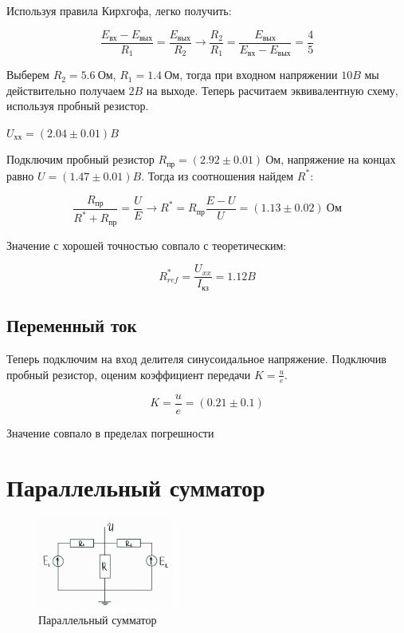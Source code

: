 \documentclass[a4paper]{article}
\begin{document}
Используя правила Кирхгофа, легко получить:

\begin{equation}
    \frac{E_\text{вх} - E_\text{вых}}{R_1} = \frac{E_\text{вых}}{R_2} \longrightarrow \frac{R_2}{R_1} = \frac{E_\text{вых}}{E_\text{вх} - E_\text{вых}} = \frac{4}{5}
\end{equation}

Выберем $R_2 = 5.6 \ \text{Ом}$, $R_1 = 1.4 \ \text{Ом}$,
тогда при входном напряжении $10B$ мы действительно получаем $2B$ на выходе.
Теперь расчитаем эквивалентную схему, используя пробный резистор. 

$U_\text{хх} = (2.04 \pm 0.01)B$

Подключим пробный резистор $R_\text{пр} = (2.92 \pm 0.01)\ \text{Ом}$, 
напряжение на концах равно $U = (1.47 \pm 0.01)B$. Тогда из соотношения найдем $R^*$:

\begin{equation}
    \frac{R_\text{пр}}{R^* + R_\text{пр}} = \frac{U}{E} \longrightarrow R^* = R_\text{пр} \frac{E - U}{U} = (1.13 \pm 0.02) \ \text{Ом}
\end{equation}

Значение с хорошей точностью совпало с теоретическим:

\begin{equation}
    R^*_{ref} = \frac{U_{xx}}{I_\text{кз}} = 1.12B
\end{equation}

\subsection{Переменный ток}

Теперь подключим на вход делителя синусоидальное напряжение. 
Подключив пробный резистор, оценим коэффициент передачи $K = \frac{u}{e}$.

\begin{equation}
    K = \frac{u}{e} = (0.21 \pm 0.1)
\end{equation}

Значение совпало в пределах погрешности

\section{Параллельный сумматор}

\begin{figure}
    \includegraphics[width = 0.40\textwidth]{summator.png}
    \caption[width = 0.90\textwidth]{Параллельный сумматор}
\end{figure}
\end{document}
